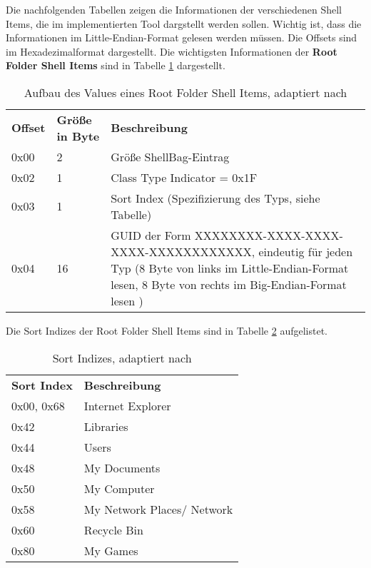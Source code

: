 Die nachfolgenden Tabellen zeigen die Informationen der verschiedenen Shell Items, die im implementierten Tool dargstellt werden sollen. Wichtig ist, dass die Informationen im Little-Endian-Format gelesen werden müssen. Die Offsets sind im Hexadezimalformat dargestellt. \newline
Die wichtigsten Informationen der \textbf{Root Folder Shell Items} sind in Tabelle \ref{rfs} dargestellt.

\begin{longtable}{|p{}|p{}|p{}|}
	\caption{Aufbau des Values eines Root Folder Shell Items, adaptiert nach \cite{shelltype}} \label{rfs} \vspace{1em} \\
	\hline
	\cellcolor{gray!25}\textbf{Offset} & \cellcolor{gray!25}\textbf{Größe in Byte} & \cellcolor{gray!25}\textbf{Beschreibung} \\
	\hline
    0x00 & 2 & Größe ShellBag-Eintrag\\
	\hline
	0x02 & 1 & Class Type Indicator = 0x1F \\
	\hline
	0x03 & 1 & Sort Index (Spezifizierung des Typs, siehe Tabelle) \\
	\hline
	0x04 & 16 & GUID der Form XXXXXXXX-XXXX-XXXX-XXXX-XXXXXXXXXXXX, eindeutig für jeden Typ (8 Byte von links im Little-Endian-Format lesen, 8 Byte von rechts im Big-Endian-Format lesen \cite{ba}) \\
	\hline
\end{longtable}
\vspace{1em}

Die Sort Indizes der Root Folder Shell Items sind in Tabelle \ref{sort} aufgelistet. 

\begin{longtable}{|p{}|p{}|}
	\caption{Sort Indizes, adaptiert nach \cite{shelltype}} \label{sort} \vspace{1em} \\
	\hline
	\cellcolor{gray!25}\textbf{Sort Index} & \cellcolor{gray!25}\textbf{Beschreibung} \\
	\hline
	0x00, 0x68 & Internet Explorer\\
	\hline
	0x42 & Libraries \\
	\hline
	0x44 & Users \\
	\hline
	0x48 & My Documents \\
	\hline
	0x50 & My Computer \\
	\hline
	0x58 & My Network Places/ Network \\
	\hline
	0x60 & Recycle Bin \\
	\hline
	0x80 & My Games \\
	\hline
\end{longtable}
\vspace{1em}


